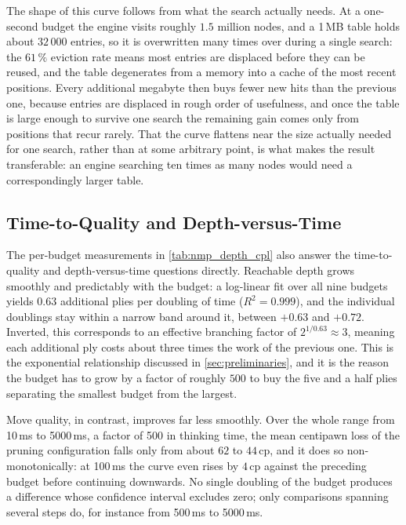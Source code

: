 The shape of this curve follows from what the search actually needs. At a
one-second budget the engine visits roughly $1.5$ million nodes, and a 1\,MB table
holds about $32\,000$ entries, so it is overwritten many times over during a single
search: the $61\,\%$ eviction rate means most entries are displaced before they can
be reused, and the table degenerates from a memory into a cache of the most recent
positions. Every additional megabyte then buys fewer new hits than the previous
one, because entries are displaced in rough order of usefulness, and once the
table is large enough to survive one search the remaining gain comes only from
positions that recur rarely. That the curve flattens near the size actually needed
for one search, rather than at some arbitrary point, is what makes the result
transferable: an engine searching ten times as many nodes would need a
correspondingly larger table.

\subsection{Time-to-Quality and Depth-versus-Time}
\label{subsec:eval_ttq}

The per-budget measurements in \cref{tab:nmp_depth_cpl} also answer the
time-to-quality and depth-versus-time questions directly. Reachable depth grows
smoothly and predictably with the budget: a log-linear fit over all nine budgets
yields $0.63$ additional plies per doubling of time ($R^2 = 0.999$), and the
individual doublings stay within a narrow band around it, between $+0.63$ and
$+0.72$. Inverted, this corresponds to
an effective branching factor of $2^{1/0.63} \approx 3$, meaning each additional
ply costs about three times the work of the previous one. This is the exponential
relationship discussed in \cref{sec:preliminaries}, and it is the reason the
budget has to grow by a factor of roughly $500$ to buy the five and a half plies
separating the smallest budget from the largest.

Move quality, in contrast, improves far less smoothly. Over the whole range from
10\,ms to 5000\,ms, a factor of 500 in thinking time, the mean centipawn loss of
the pruning configuration falls only from about $62$ to $44$\,cp, and it does so
non-monotonically: at 100\,ms the curve even rises by $4$\,cp against the
preceding budget before continuing downwards. No single doubling of the budget produces a difference
whose confidence interval excludes zero; only comparisons spanning several steps
do, for instance from 500\,ms to 5000\,ms.

